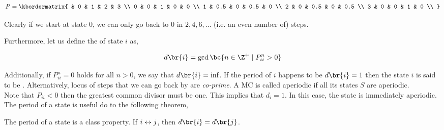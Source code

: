 \documentclass{article}
\begin{document}
\begin{example}
    \[ P = \kbordermatrix{
          & 0 & 1 & 2 & 3 \\
        0 & 0 & 1 & 0 & 0 \\
        1 & 0.5 & 0 & 0.5 & 0 \\
        2 & 0 & 0.5 & 0 & 0.5 \\
        3 & 0 & 0 & 1 & 0 \\
    } \]
    \begin{center}
    \end{center}
    Clearly if we start at state $0$, we can only go back to $0$ in $2,4,6,\ldots$ (i.e. an even number of) steps.
\end{example}
Furthermore, let us define the  of state $i$ as,

\[ d\br{i} = \gcd \bc{n \in \Z^{+} \mid P_{ii}^{n} > 0} \]

Additionally, if $P_{ii}^{n} = 0$ holds for all $n > 0$, we say that $d\br{i} = \inf$. If the period of $i$ happens to be $d\br{i} = 1$ then the state $i$ is said to be . Alternatively, locus of steps that we can go back by are \textit{co-prime}. A MC is called aperiodic if all its states $S$ are aperiodic.\\

Note that $P_{ii} < 0$ then the greatest common divisor must be one. This implies that $d_i = 1$. In this case, the state is immediately aperiodic.\\

The period of a state is useful do to the following theorem,

\begin{theorem}
\label{thm:period_clasS_prop}
The period of a state is a class property. If ${i}\leftrightarrow{j}$, then $d\br{i} = d\br{j}$.
\end{theorem}
\end{document}
